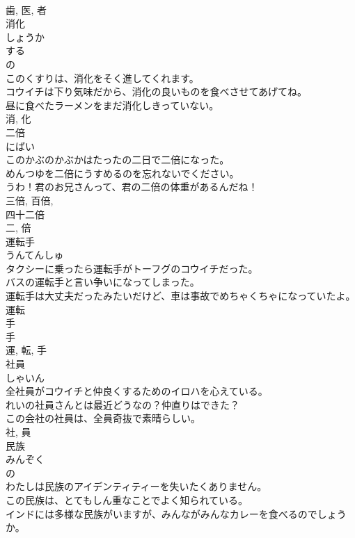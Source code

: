 \documentclass[8pt]{extreport}
\begin{document}
\begin{CJK}{UTF8}{min}
\\	歯, 医, 者	
\\	消化	
\\	しょうか	
\\	する 
\\	の 
\\	このくすりは、消化をそく進してくれます。	
\\	コウイチは下り気味だから、消化の良いものを食べさせてあげてね。	
\\	昼に食べたラーメンをまだ消化しきっていない。	
\\	消, 化	
\\	二倍	
\\	にばい	
\\	このかぶのかぶかはたったの二日で二倍になった。	
\\	めんつゆを二倍にうすめるのを忘れないでください。	
\\	うわ！君のお兄さんって、君の二倍の体重があるんだね！	
\\	三倍, 百倍, 
\\	四十二倍 
\\	二, 倍	
\\	運転手	
\\	うんてんしゅ	
\\	タクシーに乗ったら運転手がトーフグのコウイチだった。	
\\	バスの運転手と言い争いになってしまった。	
\\	運転手は大丈夫だったみたいだけど、車は事故でめちゃくちゃになっていたよ。	
\\	運転 
\\	手 
\\	手 
\\	運, 転, 手	
\\	社員	
\\	しゃいん	
\\	全社員がコウイチと仲良くするためのイロハを心えている。	
\\	れいの社員さんとは最近どうなの？仲直りはできた？	
\\	この会社の社員は、全員奇抜で素晴らしい。	
\\	社, 員	
\\	民族	
\\	みんぞく	
\\	の 
\\	わたしは民族のアイデンティティーを失いたくありません。	
\\	この民族は、とてもしん重なことでよく知られている。	
\\	インドには多様な民族がいますが、みんながみんなカレーを食べるのでしょうか。	

\end{CJK}
\end{document}
